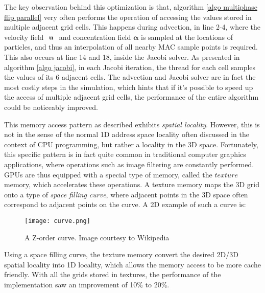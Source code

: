 The key observation behind this optimization is that, algorithm \ref{algo multiphase flip parallel} very often performs the operation of accessing the values stored in multiple adjacent grid cells. This happens during advection, in line 2-4, where the velocity field $\textbf{ \textbf{u} }$ and concentration field $\bm{\alpha}$ is sampled at the locations of particles, and thus an interpolation of all nearby MAC sample points is required. This also occurs at line 14 and 18, inside the Jacobi solver. As presented in algorithm \ref{algo jacobi}, in each Jacobi iteration, the thread for each cell samples the values of its 6 adjacent cells. The advection and Jacobi solver are in fact the most costly steps in the simulation, which hints that if it's possible to speed up the access of multiple adjacent grid cells, the performance of the entire algorithm could be noticeably improved.

This memory access pattern as described exhibits \textit{spatial locality}. However, this is not in the sense of the normal 1D address space locality often discussed in the context of CPU programming, but rather a locality in the 3D space. Fortunately, this specific pattern is in fact quite common in traditional computer graphics applications, where operations such as image filtering are constantly performed. GPUs are thus equipped with a special type of memory, called the $texture$ memory, which accelerates these operations. A texture memory maps the 3D grid onto a type of \textit{space filling curve}, where adjacent points in the 3D space often correspond to adjacent points on the curve. A 2D example of such a curve is:

\begin{figure}[H]
    \centering
        \texttt{[image: curve.png]}
    \caption{A Z-order curve. Image courtesy to Wikipedia}
    \label{}
\end{figure}

Using a space filling curve, the texture memory convert the desired 2D/3D spatial locality into 1D locality, which allows the memory access to be more cache friendly. With all the grids stored in textures, the performance of the implementation saw an improvement of 10\% to 20\%.


